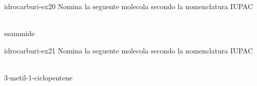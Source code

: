 \documentclass[preview]{standalone}
\begin{document}
\begin{snippetexercise}{idrocarburi-ex20}
    {Nomina la seguente molecola secondo la nomenclatura IUPAC}
    \begin{center}
        \\\vspace{0.25cm}
        esammide
    \end{center}
\end{snippetexercise}

\begin{snippetexercise}{idrocarburi-ex21}
    {Nomina la seguente molecola secondo la nomenclatura IUPAC}
    \begin{center}
        \\\vspace{0.25cm}
        3-metil-1-ciclopentene
    \end{center}
\end{snippetexercise}
\end{document}
